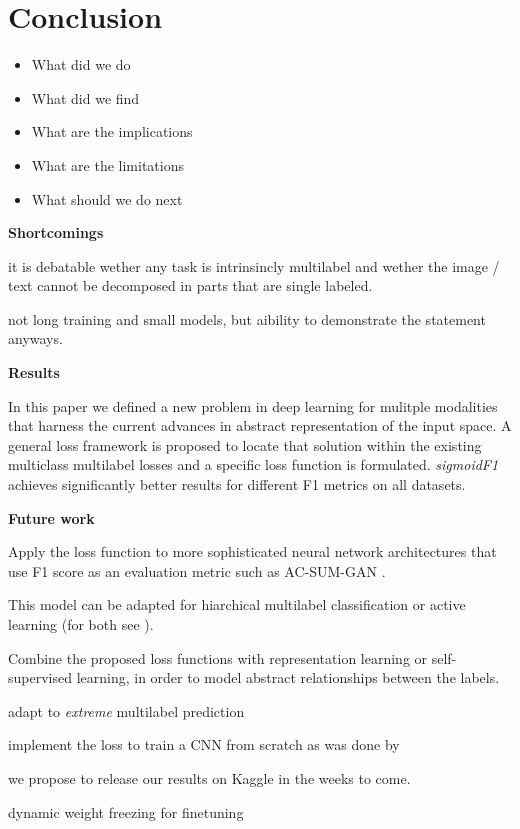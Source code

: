 
\section{Conclusion}
\label{sec:orged3d8a1}
\begin{itemize}[leftmargin=*]
\item What did we do
\item What did we find
\item What are the implications
\item What are the limitations
\item What should we do next
\end{itemize}


\textbf{Shortcomings}

it is debatable wether any task is intrinsincly multilabel and wether the image / text cannot be decomposed in parts that are single labeled.

not long training and small models, but aibility to demonstrate the statement anyways.

\textbf{Results}

In this paper we defined a new problem in deep learning for mulitple modalities that harness the current advances in abstract representation of the input space. A general loss framework is proposed to locate that solution within the existing multiclass multilabel losses and a specific loss function is formulated. \emph{sigmoidF1} achieves significantly better results for different F1 metrics on all datasets.

\textbf{Future work}

Apply the loss function to more sophisticated neural network architectures that use F1 score as an evaluation metric such as AC-SUM-GAN \cite{AC-SUM-GAN}.

This model can be adapted for hiarchical multilabel classification \cite{HARAM} or active learning (for both see \cite{activeLearningMultiLabel}).

Combine the proposed loss functions with representation learning \cite{unsupervisedImage,highResRepresentation} or self-supervised learning, in order to model abstract relationships between the labels.

adapt to \emph{extreme} multilabel prediction \cite{extremeMultilabelText}

implement the loss to train a CNN from scratch as was done by \cite{tencent}

we propose to release our results on Kaggle in the weeks to come.

dynamic weight freezing for finetuning~\cite{ULMFit}

